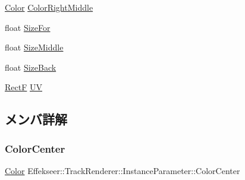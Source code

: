 \begin{DoxyCompactItemize}
\item 
\mbox{\hyperlink{struct_effekseer_1_1_color}{Color}} \mbox{\hyperlink{struct_effekseer_1_1_track_renderer_1_1_instance_parameter_a2b2a8d82514dde16ea95aa92a7533d1a}{Color\+Right\+Middle}}
\item 
float \mbox{\hyperlink{struct_effekseer_1_1_track_renderer_1_1_instance_parameter_a419cc8b0ea90c255db6a2892123b55ab}{Size\+For}}
\item 
float \mbox{\hyperlink{struct_effekseer_1_1_track_renderer_1_1_instance_parameter_a0477fd7ea1408c353ed1eeb9db7cfbb7}{Size\+Middle}}
\item 
float \mbox{\hyperlink{struct_effekseer_1_1_track_renderer_1_1_instance_parameter_a6fd93480b3976a53663430bd801af294}{Size\+Back}}
\item 
\mbox{\hyperlink{struct_effekseer_1_1_rect_f}{RectF}} \mbox{\hyperlink{struct_effekseer_1_1_track_renderer_1_1_instance_parameter_af468b7ab57e170535ef8952a5a1a1e17}{UV}}
\end{DoxyCompactItemize}


\subsection{メンバ詳解}
\mbox{\label{struct_effekseer_1_1_track_renderer_1_1_instance_parameter_a6aec16fb81faff1c49ff32c6c2e52a84}} 
\subsubsection{\texorpdfstring{Color\+Center}{ColorCenter}}
{\footnotesize\ttfamily \mbox{\hyperlink{struct_effekseer_1_1_color}{Color}} Effekseer\+::\+Track\+Renderer\+::\+Instance\+Parameter\+::\+Color\+Center}

\mbox{\label{struct_effekseer_1_1_track_renderer_1_1_instance_parameter_a8ab50cc1bf148e1c90720e6c5f1b7632}} 
